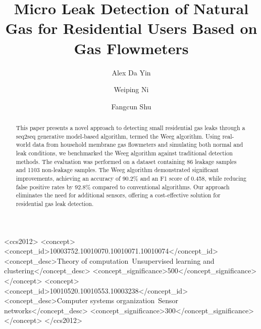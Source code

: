 \documentclass[10pt, sigconf]{acmart}
\begin{document}
\title{Micro Leak Detection of Natural Gas for Residential Users Based on Gas Flowmeters}

\author{Alex Da Yin}
\authornotemark[1]

\author{Weiping Ni}

\author{Fangcun Shu}


\renewcommand{\shortauthors}{Yin et al.}


\begin{abstract}
This paper presents a novel approach to detecting small residential gas leaks through a seq2seq generative model-based algorithm, termed the Weeg algorithm. Using real-world data from household membrane gas flowmeters and simulating both normal and leak conditions, we benchmarked the Weeg algorithm against traditional detection methods. The evaluation was performed on a dataset containing 86 leakage samples and 1103 non-leakage samples. The Weeg algorithm demonstrated significant improvements, achieving an accuracy of 90.2\% and an F1 score of 0.458, while reducing false positive rates by 92.8\% compared to conventional algorithms. Our approach eliminates the need for additional sensors, offering a cost-effective solution for residential gas leak detection.
\end{abstract}


\begin{CCSXML}
<ccs2012>
   <concept>
       <concept_id>10003752.10010070.10010071.10010074</concept_id>
       <concept_desc>Theory of computation~Unsupervised learning and clustering</concept_desc>
       <concept_significance>500</concept_significance>
       </concept>
   <concept>
       <concept_id>10010520.10010553.10003238</concept_id>
       <concept_desc>Computer systems organization~Sensor networks</concept_desc>
       <concept_significance>300</concept_significance>
       </concept>
 </ccs2012>
\end{CCSXML}
\end{document}
